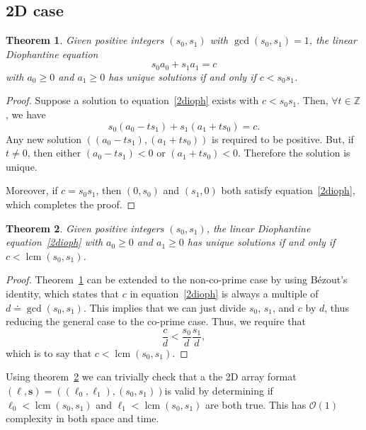 \documentclass[twocolumn,10pt,notitlepage]{article}
\newtheorem{theorem}{Theorem}[section]
\DeclareMathOperator{\lcm}{lcm}
\begin{document}
\subsection{2D case}

\begin{theorem}{}
\label{2dcoprime}
  Given positive integers $(s_0,s_1)$ with $\gcd(s_0,s_1)=1$, the
  linear Diophantine equation
  \begin{dmath}
    \label{2dioph}
    s_0  a_0 + s_1 a_1 = c
  \end{dmath}
  with $a_0\geq{}0$ and $a_1\geq{}0$ has unique solutions if and only
  if $c < s_0s_1$.
\end{theorem}
\begin{proof}
  Suppose a solution to equation~\eqref{2dioph} exists with
  $c<s_0s_1$.  Then,  $\forall t\in\mathbb{Z}$, we have
  \begin{dmath}
    \label{2ddiopht}
    s_0  (a_0 -t s_1) + s_1 (a_1 + t s_0) = c.
  \end{dmath}
  Any new solution $\left((a_0-t s_1),(a_1 + t s_0)\right)$ is
  required to be positive.  But, if $t\neq{}0$, then either $(a_0 -t
  s_1)<0$ or $(a_1 + t s_0)<0$.  Therefore the solution is unique.
  
  Moreover, if $c=s_0s_1$, then $(0, s_0)$ and $(s_1, 0)$ both satisfy
  equation~\eqref{2dioph}, which completes the proof.
\end{proof}

\begin{theorem}{}
\label{2dgeneral}
Given positive integers $(s_0,s_1)$, the linear Diophantine
equation~\eqref{2dioph} with $a_0\geq{}0$ and $a_1\geq{}0$ has unique
solutions if and only if $c < \lcm(s_0,s_1)$.
\end{theorem}
\begin{proof}
  Theorem~\ref{2dcoprime} can be extended to the non-co-prime case by
  using Bézout's identity, which states that $c$ in
  equation~\eqref{2dioph} is always a multiple of
  $d\doteq{}\gcd(s_0,s_1)$.  This implies that we can just divide
  $s_0$, $s_1$, and $c$ by $d$, thus reducing the general case to the
  co-prime case.  Thus, we require that
  \begin{dmath}
    \frac{c}{d} < \frac{s_0}{d} \frac{s_1}{d},
  \end{dmath}
  which is to say that $c < \lcm(s_0,s_1)$.
\end{proof}
  
Using theorem~\ref{2dgeneral} we can trivially check that a the 2D
array format $(\bm{\ell},\bm{s})=((\ell_0,\ell_1),(s_0,s_1)) $is valid
by determining if $\ell_0 < \lcm(s_0,s_1)$ and $\ell_1 <
\lcm(s_0,s_1)$ are both true.  This has $\mathcal{O}(1)$ complexity in
both space and time.
\end{document}
